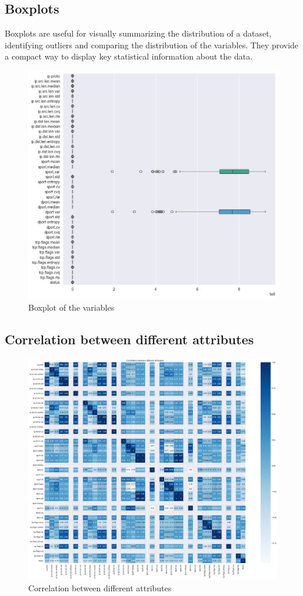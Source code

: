 \clearpage

\subsection{Boxplots}
Boxplots are useful for visually summarizing the distribution of a dataset, identifying outliers and comparing the distribution of the variables. They provide a compact way to display key statistical information about the data.

\begin{figure}[h]
	\centering
	\includegraphics[width=1\textwidth]{./assets/images/boxplot.png}
	\caption{Boxplot of the variables}
\end{figure}

\clearpage

\subsection{Correlation between different attributes}
\begin{figure}[h]
	\centering
	\includegraphics[width=1\textwidth]{./assets/images/correlation.png}
	\caption{Correlation between different attributes}
\end{figure}

